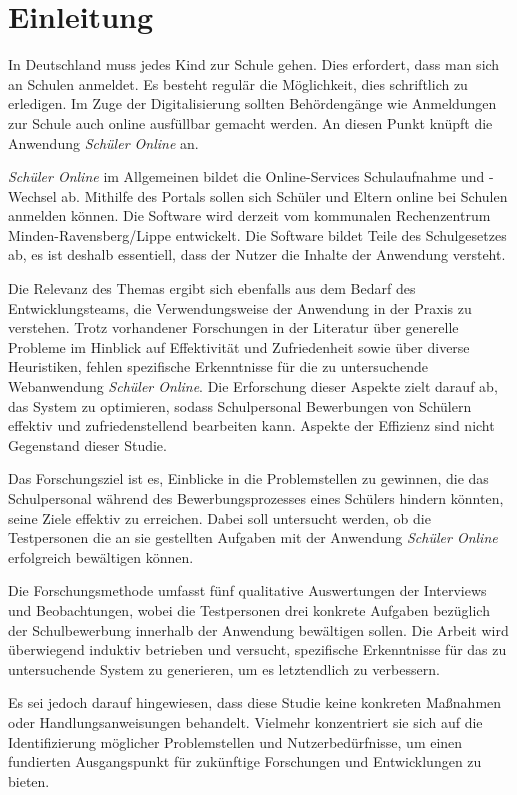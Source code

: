 \section{Einleitung}
In Deutschland muss jedes Kind zur Schule gehen. Dies erfordert, dass man sich an Schulen anmeldet. Es besteht regulär die Möglichkeit, dies schriftlich zu erledigen. Im Zuge der Digitalisierung sollten Behördengänge wie Anmeldungen zur Schule auch online ausfüllbar gemacht werden. An diesen Punkt knüpft die Anwendung \textit{Schüler Online} an.

\textit{Schüler Online} im Allgemeinen bildet die Online-Services Schulaufnahme und -Wechsel ab. Mithilfe des Portals sollen sich Schüler und Eltern online bei Schulen anmelden können. Die Software wird derzeit vom kommunalen Rechenzentrum Minden-Ravensberg/Lippe entwickelt. Die Software bildet Teile des Schulgesetzes ab, es ist deshalb essentiell, dass der Nutzer die Inhalte der Anwendung versteht. 

Die Relevanz des Themas ergibt sich ebenfalls aus dem Bedarf des Entwicklungsteams, die Verwendungsweise der Anwendung in der Praxis zu verstehen. Trotz vorhandener Forschungen in der Literatur über generelle Probleme im Hinblick auf Effektivität und Zufriedenheit sowie über diverse Heuristiken, fehlen spezifische Erkenntnisse für die zu untersuchende Webanwendung \textit{Schüler Online}. Die Erforschung dieser Aspekte zielt darauf ab, das System zu optimieren, sodass Schulpersonal Bewerbungen von Schülern effektiv und zufriedenstellend bearbeiten kann. Aspekte der Effizienz sind nicht Gegenstand dieser Studie.

Das Forschungsziel ist es, Einblicke in die Problemstellen zu gewinnen, die das Schulpersonal während des Bewerbungsprozesses eines Schülers hindern könnten, seine Ziele effektiv zu erreichen. Dabei soll untersucht werden, ob die Testpersonen die an sie gestellten Aufgaben mit der Anwendung \textit{Schüler Online}  erfolgreich bewältigen können. 

Die Forschungsmethode umfasst fünf qualitative Auswertungen der Interviews und Beobachtungen, wobei die Testpersonen drei konkrete Aufgaben bezüglich der Schulbewerbung innerhalb der Anwendung bewältigen sollen. Die Arbeit wird überwiegend induktiv betrieben und versucht, spezifische Erkenntnisse für das zu untersuchende System zu generieren, um es letztendlich zu verbessern.

Es sei jedoch darauf hingewiesen, dass diese Studie keine konkreten Maßnahmen oder Handlungsanweisungen behandelt. Vielmehr konzentriert sie sich auf die Identifizierung möglicher Problemstellen und Nutzerbedürfnisse, um einen fundierten Ausgangspunkt für zukünftige Forschungen und Entwicklungen zu bieten.

